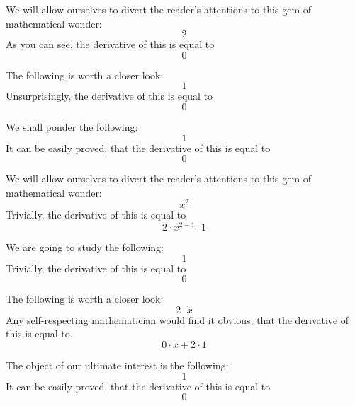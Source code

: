 \documentclass{article}
\begin{document}
We will allow ourselves to divert the reader's attentions to this gem of mathematical wonder:
\begin{equation}
2 
\end{equation}
As you can see, the derivative of this is equal to
\begin{equation}
0 
\end{equation}

The following is worth a closer look:
\begin{equation}
1 
\end{equation}
Unsurprisingly, the derivative of this is equal to
\begin{equation}
0 
\end{equation}

We shall ponder the following:
\begin{equation}
1 
\end{equation}
It can be easily proved, that the derivative of this is equal to
\begin{equation}
0 
\end{equation}

We will allow ourselves to divert the reader's attentions to this gem of mathematical wonder:
\begin{equation}
x ^{2 } 
\end{equation}
Trivially, the derivative of this is equal to
\begin{equation}
2 \cdot x ^{2 - 1 } \cdot 1 
\end{equation}

We are going to study the following:
\begin{equation}
1 
\end{equation}
Trivially, the derivative of this is equal to
\begin{equation}
0 
\end{equation}

The following is worth a closer look:
\begin{equation}
2 \cdot x 
\end{equation}
Any self-respecting mathematician would find it obvious, that the derivative of this is equal to
\begin{equation}
0 \cdot x + 2 \cdot 1 
\end{equation}

The object of our ultimate interest is the following:
\begin{equation}
1 
\end{equation}
It can be easily proved, that the derivative of this is equal to
\begin{equation}
0 
\end{equation}
\end{document}

